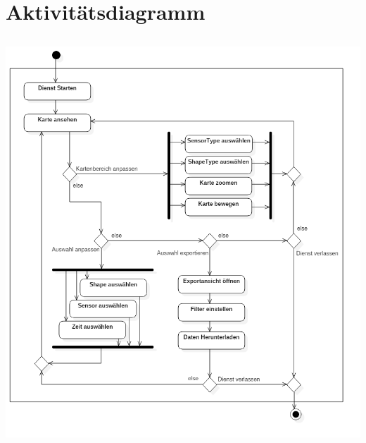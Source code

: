 \section{Aktivitätsdiagramm}
    \subsection{}
        \includegraphics[width=1\linewidth]{diagrams/ActivityDiagram1.png}

        
